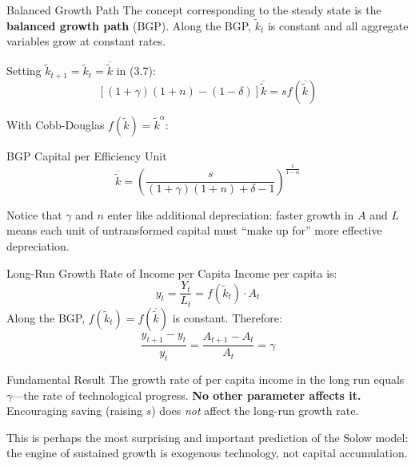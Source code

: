 \documentclass[aspectratio=169,10pt]{beamer}
\newcommand{\apxbutton}[1]{\hfill\hyperlink{#1}{\beamerbutton{Appendix}}}
\begin{document}
\begin{frame}{Balanced Growth Path}
\hypertarget{m-a8}{}
The concept corresponding to the steady state is the \textbf{balanced growth path} (BGP). Along the BGP, $\tilde{k}_t$ is constant and all aggregate variables grow at constant rates.

\medskip
Setting $\tilde{k}_{t+1}=\tilde{k}_t=\overline{\tilde{k}}$ in (3.7):
\[
[(1+\gamma)(1+n) - (1-\delta)]\overline{\tilde{k}} = s f(\overline{\tilde{k}})
\]

With Cobb-Douglas $f(\tilde{k})=\tilde{k}^{\alpha}$:
\begin{block}{BGP Capital per Efficiency Unit}
\[
\overline{\tilde{k}}=\left(\frac{s}{(1+\gamma)(1+n)+\delta-1}\right)^{\frac{1}{1-\alpha}} \tag{3.8}
\]
\end{block}
Notice that $\gamma$ and $n$ enter like additional depreciation: faster growth in $A$ and $L$ means each unit of untransformed capital must ``make up for'' more effective depreciation.
\apxbutton{a8}
\end{frame}

\begin{frame}{Long-Run Growth Rate of Income per Capita}
\hypertarget{m-a9}{}
Income per capita is:
\[
y_t = \frac{Y_t}{L_t} = f(\tilde{k}_t)\cdot A_t
\]
Along the BGP, $f(\tilde{k}_t) = f(\overline{\tilde{k}})$ is constant. Therefore:
\[
\frac{y_{t+1}-y_t}{y_t}=\frac{A_{t+1}-A_t}{A_t}=\gamma
\]

\begin{block}{Fundamental Result}
The growth rate of per capita income in the long run equals $\gamma$---the rate of technological progress. \textbf{No other parameter affects it.} Encouraging saving (raising $s$) does \emph{not} affect the long-run growth rate.
\end{block}

This is perhaps the most surprising and important prediction of the Solow model: the engine of sustained growth is exogenous technology, not capital accumulation.
\apxbutton{a9}
\end{frame}
\end{document}

